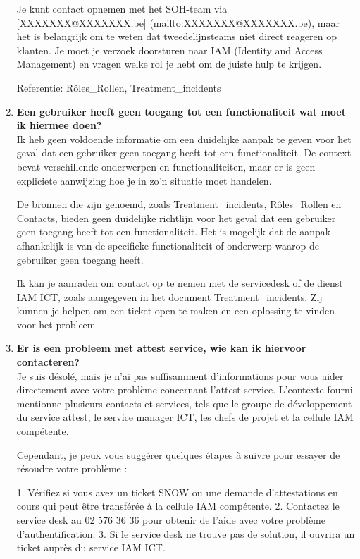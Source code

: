 \begin{enumerate}
    Je kunt contact opnemen met het SOH-team via [XXXXXXX@XXXXXXX.be]
    (mailto:XXXXXXX@XXXXXXX.be), maar het is belangrijk om te weten dat tweedelijnsteams niet direct reageren op klanten. Je moet je verzoek doorsturen naar IAM (Identity and Access Management) en vragen welke rol je hebt om de juiste hulp te krijgen.
    
    Referentie: Rôles\_Rollen, Treatment\_incidents
    
    
    \item \textbf{Een gebruiker heeft geen toegang tot een functionaliteit wat moet ik hiermee doen?} \\
    Ik heb geen voldoende informatie om een duidelijke aanpak te geven voor het geval dat een gebruiker geen toegang heeft tot een functionaliteit. De context bevat verschillende onderwerpen en functionaliteiten, maar er is geen expliciete aanwijzing hoe je in zo'n situatie moet handelen.
    
    De bronnen die zijn genoemd, zoals Treatment\_incidents, Rôles\_Rollen en Contacts, bieden geen duidelijke richtlijn voor het geval dat een gebruiker geen toegang heeft tot een functionaliteit. Het is mogelijk dat de aanpak afhankelijk is van de specifieke functionaliteit of onderwerp waarop de gebruiker geen toegang heeft.
    
    Ik kan je aanraden om contact op te nemen met de servicedesk of de dienst IAM ICT, zoals aangegeven in het document Treatment\_incidents. Zij kunnen je helpen om een ticket open te maken en een oplossing te vinden voor het probleem.   
    
    \item \textbf{Er is een probleem met attest service, wie kan ik hiervoor contacteren?} \\
    Je suis désolé, mais je n'ai pas suffisamment d'informations pour vous aider directement avec votre problème concernant l'attest service. L'contexte fourni mentionne plusieurs contacts et services, tels que le groupe de développement du service attest, le service manager ICT, les chefs de projet et la cellule IAM compétente.
    
    Cependant, je peux vous suggérer quelques étapes à suivre pour essayer de résoudre votre problème :
    
    1. Vérifiez si vous avez un ticket SNOW ou une demande d'attestations en cours qui peut être transférée à la cellule IAM compétente.
    2. Contactez le service desk au 02 576 36 36 pour obtenir de l'aide avec votre problème d'authentification.
    3. Si le service desk ne trouve pas de solution, il ouvrira un ticket auprès du service IAM ICT.
    

\end{enumerate}
